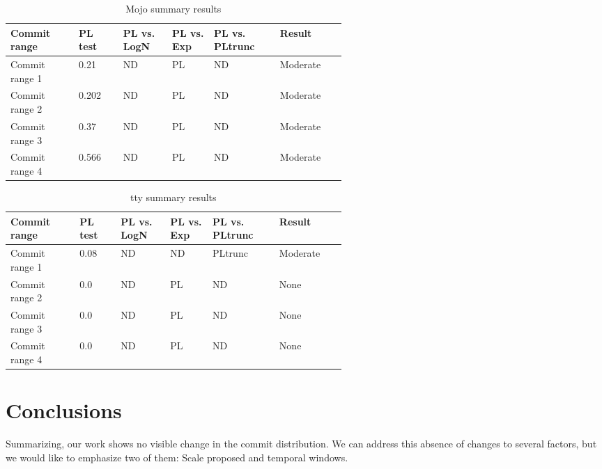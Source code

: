 \documentclass[conference]{IEEEtran}
\begin{document}
\begin{table}[h!tbp]
  \caption{Mojo summary results}
  \begin{center}
    \begin{tabular}{| p{0.12\linewidth} | p{0.08\linewidth}  | p{0.08\linewidth} |
        p{0.08\linewidth} | p{0.1\linewidth} | p{0.1\linewidth}
       |}
      \hline
      Commit range & PL test &PL vs. LogN & PL vs. Exp & PL vs. PLtrunc & Result \\
      \hline
      Commit range 1 & 0.21& ND & PL  & ND & Moderate \\
      Commit range 2& 0.202& ND & PL  & ND & Moderate \\
      Commit range 3& 0.37& ND  &  PL & ND & Moderate \\
      Commit range 4&0.566 & ND & PL  & ND & Moderate \\
      \hline

      \hline
    \end{tabular}
  \end{center}
  \label{tab:2019testsmojo}
\end{table}


\begin{table}[h!tbp]
  \caption{tty summary results}
  \begin{center}
    \begin{tabular}{| p{0.12\linewidth} | p{0.08\linewidth} | p{0.08\linewidth} |
        p{0.08\linewidth} | p{0.1\linewidth} | p{0.1\linewidth}|}
      \hline
      Commit range & PL test &PL vs. LogN & PL vs. Exp & PL vs. PLtrunc & Result \\
      \hline
      Commit range 1 &0.08 &ND & ND  & PLtrunc & Moderate \\
      Commit range 2& 0.0&ND & PL  & ND & None \\
      Commit range 3& 0.0&ND  &  PL & ND & None \\
      Commit range 4& 0.0&ND & PL  & ND & None \\
      \hline

      \hline
    \end{tabular}
  \end{center}
  \label{tab:2019teststty}
\end{table}



\section{Conclusions}\label{conc}
Summarizing, our work shows no visible change in the commit distribution. We can address this 
absence of changes to several factors, but we would like to emphasize two of them: Scale proposed and temporal windows. 
\end{document}

